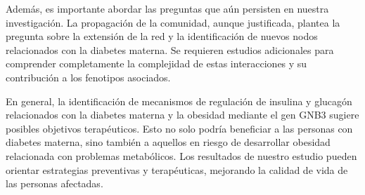 Además, es importante abordar las preguntas que aún persisten en nuestra investigación. La propagación de la comunidad, aunque justificada, plantea la pregunta sobre la extensión de la red y la identificación de nuevos nodos relacionados con la diabetes materna. Se requieren estudios adicionales para comprender completamente la complejidad de estas interacciones y su contribución a los fenotipos asociados.

En general, la identificación de mecanismos de regulación de insulina y glucagón relacionados con la diabetes materna y la obesidad\cite{Shah2011} mediante el gen GNB3 sugiere posibles objetivos terapéuticos. Esto no solo podría beneficiar a las personas con diabetes materna, sino también a aquellos en riesgo de desarrollar obesidad relacionada con problemas metabólicos. Los resultados de nuestro estudio pueden orientar estrategias preventivas y terapéuticas, mejorando la calidad de vida de las personas afectadas.

